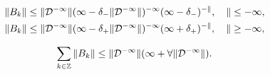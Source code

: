 \begin{thm}
\begin{itemize}
\begin{gather}
% 


\|B_k\|\le\|\cal D^{-1}\|(1-\delta_-\|\cal D^{-1}\|)^{-1} 


(1-\delta_-)^{-k}, \quad k\le -1,\\ 


% 


\|B_k\|\le\|\cal D^{-1}\|(1-\delta_+\|\cal D^{-1}\|)^{-1} 


(1+\delta_+)^{-k}, \quad k\ge -1,


\end{gather} 


$$ 


\sum_{k\in\Bbb Z}\|B_k\|\le \|\cal D^{-1}\|(1+8\|\cal D^{-1}\|). 


$$ 


\end{itemize} 


\end{thm} 


 


